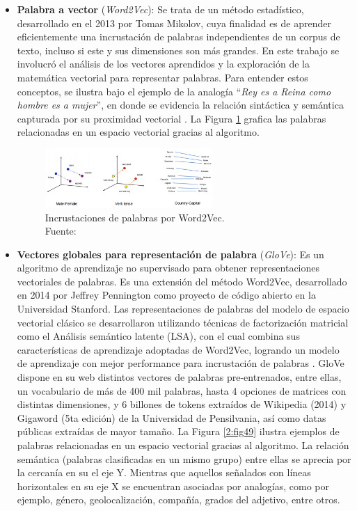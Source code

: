 \begin{itemize}
\begin{itemize}
		\item \textbf{Palabra a vector} (\textit{Word2Vec}): Se trata de un método estadístico, desarrollado en el 2013 por Tomas Mikolov, cuya finalidad es de aprender eficientemente una incrustación de palabras independientes de un corpus de texto, incluso si este y sus dimensiones son más grandes. En este trabajo se involucró el análisis de los vectores aprendidos y la exploración de la matemática vectorial para representar palabras. Para entender estos conceptos, se ilustra bajo el ejemplo de la analogía “\textit{Rey es a Reina como hombre es a mujer}”, en donde se evidencia la relación sintáctica y semántica capturada por su proximidad vectorial \parencite{bk_brownlee2017deeplearning_nlp}. La Figura \ref{2:fig48} grafica las palabras relacionadas en un espacio vectorial gracias al algoritmo.
		
		\begin{figure}[!ht]
			\begin{center}
				\includegraphics[width=0.60\textwidth]{2/figures/word2vec.png}
				\caption[Incrustaciones de palabras por Word2Vec]{Incrustaciones de palabras por Word2Vec.\\
				Fuente: \cite{tec_bujokas2020word2vec}}
				\label{2:fig48}
			\end{center}
		\end{figure}
		
		\item \textbf{Vectores globales para representación de palabra} (\textit{GloVe}): Es un algoritmo de aprendizaje no supervisado para obtener representaciones vectoriales de palabras. Es una extensión del método Word2Vec, desarrollado en 2014 por Jeffrey Pennington como proyecto de código abierto en la Universidad Stanford. Las representaciones de palabras del modelo de espacio vectorial clásico se desarrollaron utilizando técnicas de factorización matricial como el Análisis semántico latente (LSA), con el cual combina sus características de aprendizaje adoptadas de Word2Vec, logrando un modelo de aprendizaje con mejor performance para incrustación de palabras \parencite{gl_pennington2014glove}. GloVe dispone en su web distintos vectores de palabras pre-entrenados, entre ellas, un vocabulario de más de 400 mil palabras, hasta 4 opciones de matrices con distintas dimensiones, y 6 billones de tokens extraídos de Wikipedia (2014) y Gigaword (5ta edición) de la Universidad de Pensilvania, así como datas públicas extraídas de mayor tamaño. La Figura \ref{2:fig49} ilustra ejemplos de palabras  relacionadas en un espacio vectorial gracias al algoritmo. La relación semántica (palabras clasificadas en un mismo grupo) entre ellas se aprecia por la cercanía en su el eje Y. Mientras que aquellos señalados con líneas horizontales en su eje X se encuentran asociadas por analogías, como por ejemplo, género, geolocalización, compañía, grados del adjetivo, entre otros.
		

\end{itemize}
\end{itemize}
